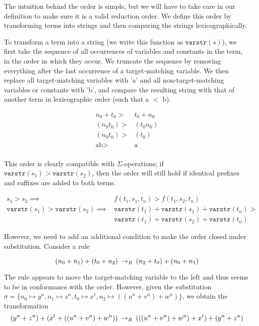 The intuition behind the order is simple, but we will have to take care in our definition to make sure it is a valid reduction order. We define this order by transforming terms into strings and then comparing the strings lexicographically.

To transform a term into a string (we write this function as $\texttt{varstr}(s)$), we first take the sequence of all occurrences of variables and constants in the term, in the order in which they occur. We truncate the sequence by removing everything after the last occurrence of a target-matching variable. We then replace all target-matching variables with 'a' and all non-target-matching variables or constants with 'b', and compare the resulting string with that of another term in lexicographic order (such that a $<$ b).

\begin{align*}
n_0 + t_0 >& t_0 + n_0 \\ 
(n_0 t_0) >& (t_0 n_0) \\ 
(n_0 t_0) >& (t_0) \\
 \textrm{ab} >& \textrm{a} \\
\end{align*}

This order is clearly compatible with $\Sigma$-operations; if $\texttt{varstr}(s_1) > \texttt{varstr}(s_2)$, then the order will still hold if identical prefixes and suffixes are added to both terms. 

\begin{align*}
s_1 > s_2 \implies & f(t_1,s_1,t_n) > f(t_1,s_2,t_n) \\
\texttt{varstr}(s_1) > \texttt{varstr}(s_2) \implies & \texttt{varstr}(t_1) + \texttt{varstr}(s_1) + \texttt{varstr}(t_n) > \\
&\texttt{varstr}(t_1) + \texttt{varstr}(s_2) + \texttt{varstr}(t_n)
\end{align*}

However, we need to add an additional condition to make the order closed under substitution. Consider a rule

\[ (n_0 + n_1) + (t_0 + n_2) \:\rightarrow_{R}\: (n_2 + t_0) + (n_0 + n_1)
\]

The rule appears to move the target-matching variable to the left and thus seems to be in conformance with the order. However, given the substitution $\sigma = \{ n_0 \mapsto y^n, n_1 \mapsto z^n, t_0 \mapsto x^t, n_2 \mapsto ((u^n + v^n) + w^n)\}$, we obtain the transformation
\[ (y^n + z^n) + (x^t + ((u^n + v^n) + w^n)) \:\rightarrow_{R}\: (((u^n + v^n) + w^n) + x^t) + (y^n + z^n)
\]

